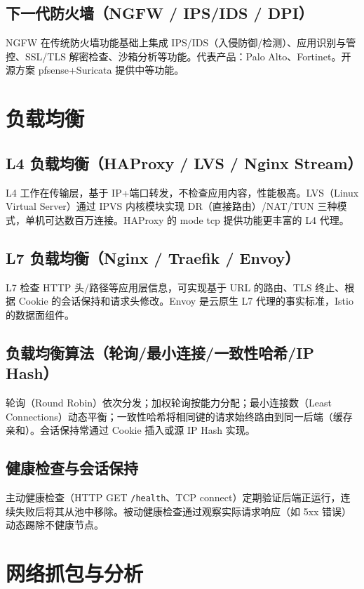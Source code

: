 \documentclass[12pt,UTF8]{ctexbook}
\begin{document}
    \subsection{下一代防火墙（NGFW / IPS/IDS / DPI）}

NGFW 在传统防火墙功能基础上集成 IPS/IDS（入侵防御/检测）、应用识别与管控、SSL/TLS 解密检查、沙箱分析等功能。代表产品：Palo Alto、Fortinet。开源方案 pfsense+Suricata 提供中等功能。

  \section{负载均衡}
    \subsection{L4 负载均衡（HAProxy / LVS / Nginx Stream）}

L4 工作在传输层，基于 IP+端口转发，不检查应用内容，性能极高。LVS（Linux Virtual Server）通过 IPVS 内核模块实现 DR（直接路由）/NAT/TUN 三种模式，单机可达数百万连接。HAProxy 的 mode tcp 提供功能更丰富的 L4 代理。

    \subsection{L7 负载均衡（Nginx / Traefik / Envoy）}

L7 检查 HTTP 头/路径等应用层信息，可实现基于 URL 的路由、TLS 终止、根据 Cookie 的会话保持和请求头修改。Envoy 是云原生 L7 代理的事实标准，Istio 的数据面组件。

    \subsection{负载均衡算法（轮询/最小连接/一致性哈希/IP Hash）}

轮询（Round Robin）依次分发；加权轮询按能力分配；最小连接数（Least Connections）动态平衡；一致性哈希将相同键的请求始终路由到同一后端（缓存亲和）。会话保持常通过 Cookie 插入或源 IP Hash 实现。

    \subsection{健康检查与会话保持}

主动健康检查（HTTP GET \verb|/health|、TCP connect）定期验证后端正运行，连续失败后将其从池中移除。被动健康检查通过观察实际请求响应（如 5xx 错误）动态踢除不健康节点。

  \section{网络抓包与分析}
\end{document}
